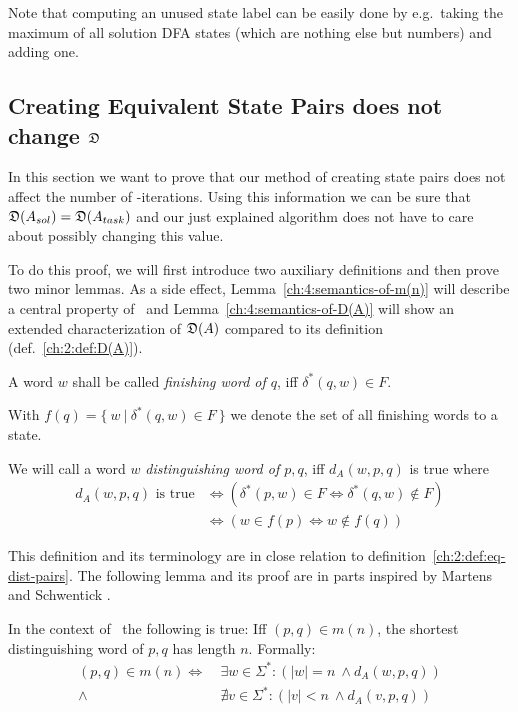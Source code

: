 \vspace{0.2cm}
\noindent Note that computing an unused state label can be easily done by e.g.\ taking the maximum of all solution DFA states (which are nothing else but numbers) and adding one.



\subsection{Creating Equivalent State Pairs does not change \texorpdfstring{$\mathfrak{D}$}{D}} \label{ch:4:sec-D-proof}

In this section we want to prove that our method of creating state pairs does not affect the number of \CompDist-iterations. Using this information we can be sure that $\mathfrak{D}(A_{sol}) = \mathfrak{D}(A_{task})$ and our just explained algorithm does not have to care about possibly changing this value.

To do this proof, we will first introduce two auxiliary definitions and then prove two minor lemmas. As a side effect, Lemma~\ref{ch:4:semantics-of-m(n)} will describe a central property of \CompDist\ and Lemma~\ref{ch:4:semantics-of-D(A)} will show an extended characterization of $\mathfrak{D}(A)$ compared to its definition (def.~\ref{ch:2:def:D(A)}).

A word $w$ shall be called \emph{finishing word of $q$}, iff $\delta^*(q, w) \in F$.

With $f(q) = \{\ w\ |\ \delta^*(q, w) \in F\ \}$ we denote the set of all finishing words to a state.
\begin{definition} \label{ch:4:def-dist-word}
	We will call a word $w$ \emph{distinguishing word of $p,q$}, iff $d_A(w, p, q)$ is true where
	\begin{align*}
	d_A(w, p, q) \text{ is true} &\Leftrightarrow (\delta^*(p,w) \in F \Leftrightarrow \delta^*(q,w) \notin F) \\
	&\Leftrightarrow (w \in f(p) \Leftrightarrow w \notin f(q))
	\end{align*}
\end{definition}
\noindent This definition and its terminology are in close relation to definition~\ref{ch:2:def:eq-dist-pairs}. The following lemma and its proof are in parts inspired by Martens and Schwentick \cite[ch.\ 4 p.\ 18]{MS18}.

\begin{lemma}\label{ch:4:semantics-of-m(n)}
    In the context of \CompDist\ the following is true: Iff $(p,q)\in m(n)$, the shortest distinguishing word of $p,q$ has length $n$. Formally:
    \begin{align*}
        (p,q) \in m(n) \Longleftrightarrow\ &\exists w\in\Sigma^*\colon (|w| = n\ \land d_A(w, p, q))\\
        \land\ &\nexists v\in\Sigma^*\colon (|v| < n\ \land d_A(v, p, q))
    \end{align*}
\end{lemma}

